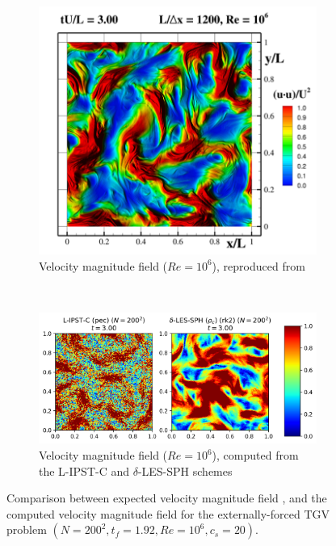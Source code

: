 \begin{figure}[htbp!]
\centering
\begin{subfigure}{10cm}
\centering\includegraphics[width=10cm]{Code-Figures/ext-force-tgv/colag_vmag_t_3.png}
\caption{Velocity magnitude field ($Re = 10^6$), reproduced from \cite{Colagrossi2021QuasiLagrangian}}
\end{subfigure}
\\ \vspace{1cm}
\begin{subfigure}{14cm}
\centering\includegraphics[width=14cm]{Code-Figures/ext-force-tgv/vmag_t_3.png}
\caption{Velocity magnitude field ($Re = 10^6$), computed from the L-IPST-C and $\delta$-LES-SPH schemes}
\end{subfigure}
\caption{Comparison between expected velocity magnitude field \parencite{Colagrossi2021QuasiLagrangian}, and the computed velocity magnitude field for the externally-forced TGV problem $(N=200^2, t_f=1.92, Re=10^6, c_s=20)$.}
\label{fig:tgv-forced-colag-vmag}
\end{figure}

